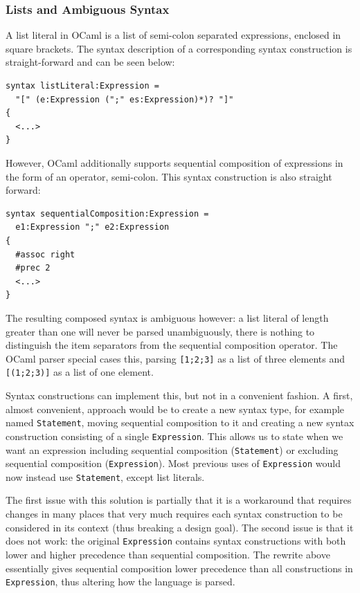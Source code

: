 \documentclass{kththesis}
\begin{document}
\subsubsection{Lists and Ambiguous Syntax} \label{sec:ambiguous-lists}

A list literal in OCaml is a list of semi-colon separated expressions, enclosed in square brackets. The syntax description of a corresponding syntax construction is straight-forward and can be seen below:

\begin{verbatim}
syntax listLiteral:Expression =
  "[" (e:Expression (";" es:Expression)*)? "]"
{
  <...>
}
\end{verbatim}

However, OCaml additionally supports sequential composition of expressions in the form of an operator, semi-colon. This syntax construction is also straight forward:

\begin{verbatim}
syntax sequentialComposition:Expression =
  e1:Expression ";" e2:Expression
{
  #assoc right
  #prec 2
  <...>
}
\end{verbatim}

The resulting composed syntax is ambiguous however: a list literal of length greater than one will never be parsed unambiguously, there is nothing to distinguish the item separators from the sequential composition operator. The OCaml parser special cases this, parsing \texttt{[1;2;3]} as a list of three elements and \texttt{[(1;2;3)]} as a list of one element.

Syntax constructions can implement this, but not in a convenient fashion. A first, almost convenient, approach would be to create a new syntax type, for example named \texttt{Statement}, moving sequential composition to it and creating a new syntax construction consisting of a single \texttt{Expression}. This allows us to state when we want an expression including sequential composition (\texttt{Statement}) or excluding sequential composition (\texttt{Expression}). Most previous uses of \texttt{Expression} would now instead use \texttt{Statement}, except list literals.

The first issue with this solution is partially that it is a workaround that requires changes in many places that very much requires each syntax construction to be considered in its context (thus breaking a design goal). The second issue is that it does not work: the original \texttt{Expression} contains syntax constructions with both lower and higher precedence than sequential composition. The rewrite above essentially gives sequential composition lower precedence than all constructions in \texttt{Expression}, thus altering how the language is parsed.
\end{document}
